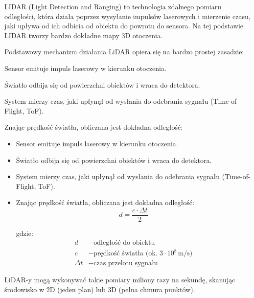 \documentclass[magisterska]{pracadypl}
\begin{document}
LIDAR (Light Detection and Ranging) to technologia zdalnego pomiaru odległości, która działa poprzez wysyłanie impulsów laserowych i mierzenie czasu, jaki upływa od ich odbicia od obiektu do powrotu do sensora. Na tej podstawie LIDAR tworzy bardzo dokładne mapy 3D otoczenia.

Podstawowy mechanizm działania LiDAR opiera się na bardzo prostej zasadzie:

Sensor emituje impuls laserowy w kierunku otoczenia.

Światło odbija się od powierzchni obiektów i wraca do detektora.

System mierzy czas, jaki upłynął od wysłania do odebrania sygnału (Time-of-Flight, ToF).

Znając prędkość światła, obliczana jest dokładna odległość:

\begin{itemize}
  \item Sensor emituje impuls laserowy w kierunku otoczenia.
  \item Światło odbija się od powierzchni obiektów i wraca do detektora.
  \item System mierzy czas, jaki upłynął od wysłania do odebrania sygnału (Time-of-Flight, ToF).
  \item Znając prędkość światła, obliczana jest dokładna odległość:
    \[
    d = \frac{c \cdot \Delta t}{2}
    \]

  gdzie:
  \begin{align*}
  d &- \text{odległość do obiektu} \\
  c &- \text{prędkość światła (ok. } 3 \cdot 10^8 \, \text{m/s)} \\
  \Delta t &- \text{czas przelotu sygnału}
  \end{align*} 
\end{itemize}

LiDAR-y mogą wykonywać takie pomiary miliony razy na sekundę, skanując środowisko w 2D (jeden plan) lub 3D (pełna chmura punktów).
\end{document}
